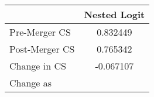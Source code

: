 \begin{tabular}{lc}
\hline
& Nested Logit \\
\hline
Pre-Merger CS & 0.832449 \\
Post-Merger CS & 0.765342 \\
Change in CS & -0.067107 \\
Change as %
\hline
\end{tabular}